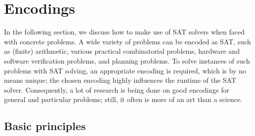 \documentclass{article}
\theoremstyle{definition}
\begin{document}
	
\section{Encodings}
	
	In the following section, we discuss how to make use of SAT solvers when faced with concrete problems.
	A wide variety of problems can be encoded as SAT, such as (finite) arithmetic, various practical combinatorial problems, hardware and software verification problems, and planning problems.
	To solve instances of such problems with SAT solving, an appropriate encoding is required, which is by no means unique; the chosen encoding highly influences the runtime of the SAT solver.
	Consequently, a lot of research is being done on good encodings for general and particular problems; still, it often is more of an art than a science.
	
	\subsection{Basic principles}
		
\end{document}
